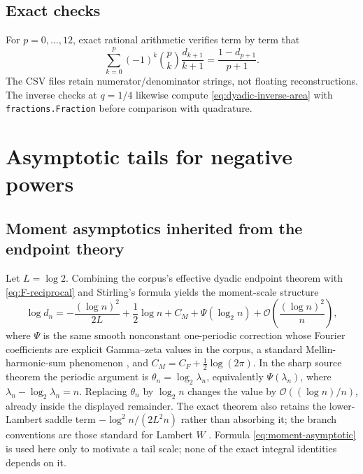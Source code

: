 \documentclass[11pt,oneside]{article}
\numberwithin{equation}{section}
\theoremstyle{definition}
\theoremstyle{remark}
\newcommand{\bigO}{\mathcal O}
\begin{document}
\subsection{Exact checks}

For $p=0,\ldots,12$, exact rational arithmetic verifies term by term that
\begin{equation}
 \sum_{k=0}^{p}(-1)^k\binom pk\frac{d_{k+1}}{k+1}
 =\frac{1-d_{p+1}}{p+1}.                                    \label{eq:exact-check}
\end{equation}
The CSV files retain numerator/denominator strings, not floating reconstructions.  The
inverse checks at $q=1/4$ likewise compute \eqref{eq:dyadic-inverse-area} with
\texttt{fractions.Fraction} before comparison with quadrature.

\section{Asymptotic tails for negative powers}
\label{sec:tails}

\subsection{Moment asymptotics inherited from the endpoint theory}

Let $L=\log2$.  Combining the corpus's effective dyadic endpoint theorem with
\eqref{eq:F-reciprocal} and Stirling's formula yields the moment-scale structure
\begin{equation}
 \log d_n
 =-\frac{(\log n)^2}{2L}+\frac12\log n+C_M
  +\Psi(\log_2n)+\bigO\!\left(\frac{(\log n)^2}{n}\right),    \label{eq:moment-asymptotic}
\end{equation}
where $\Psi$ is the same smooth nonconstant one-periodic correction whose Fourier
coefficients are explicit Gamma--zeta values in the corpus, a standard Mellin-harmonic-sum
phenomenon \cite{flajolet1995}, and
$C_M=C_F+\tfrac12\log(2\pi)$.  In the sharp source theorem the periodic argument is
\(\theta_n=\log_2\lambda_n\), equivalently \(\Psi(\lambda_n)\), where
\(\lambda_n-\log_2\lambda_n=n\).  Replacing \(\theta_n\) by \(\log_2n\) changes the
value by \(\bigO((\log n)/n)\), already inside the displayed remainder.  The exact theorem
also retains the lower-Lambert saddle term \(-\log^2n/(2L^2n)\) rather than absorbing it;
the branch conventions are those standard for Lambert $W$ \cite{corless1996}.  Formula
\eqref{eq:moment-asymptotic} is used here only to motivate a tail scale; none of the exact
integral identities depends on it.
\end{document}
